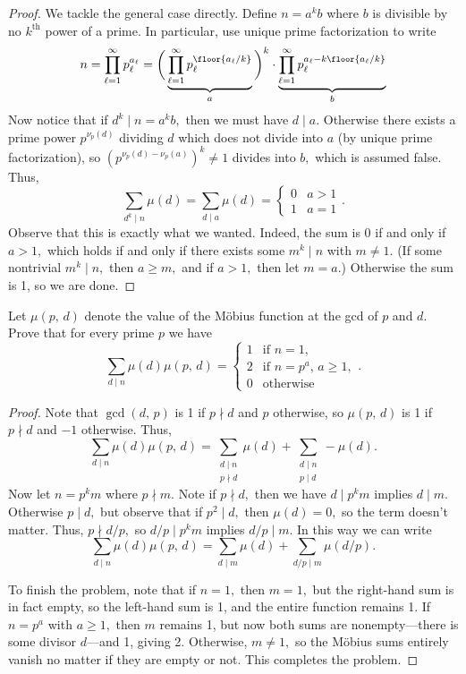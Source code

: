\begin{proof}
We tackle the general case directly. Define $n=a^kb$ where $b$ is divisible by no $k^\text{th}$ power of a prime. In particular, use unique prime factorization to write
\[n=\prod_{\ell=1}^\infty p_\ell^{a_\ell}=\bigg(\underbrace{\prod_{\ell=1}^\infty p_\ell^{\floor{a_\ell/k}}}_a\bigg)^k\cdot\underbrace{\prod_{\ell=1}^\infty p_\ell^{a_\ell-k\floor{a_\ell/k}}}_b\]
Now notice that if $d^k\mid n=a^kb,$ then we must have $d\mid a.$ Otherwise there exists a prime power $p^{\nu_p(d)}$ dividing $d$ which does not divide into $a$ (by unique prime factorization), so $\left(p^{\nu_p(d)-\nu_p(a)}\right)^k\ne1$ divides into $b,$ which is assumed false. Thus,
\[\sum_{d^k\mid n}\mu(d)=\sum_{d\mid a}\mu(d)=\begin{cases}0 & a>1 \\ 1 & a=1\end{cases}.\]
Observe that this is exactly what we wanted. Indeed, the sum is 0 if and only if $a>1,$ which holds if and only if there exists some $m^k\mid n$ with $m\ne1.$ (If some nontrivial $m^k\mid n,$ then $a\ge m,$ and if $a>1,$ then let $m=a.$) Otherwise the sum is 1, so we are done.
\end{proof}

\begin{exercise}
Let $\mu(p,\,d)$ denote the value of the M\"obius function at the gcd of $p$ and $d.$ Prove that for every prime $p$ we have
\[\sum_{d\mid n}\mu(d)\mu(p,\,d)=\begin{cases}1 &\text{if }n=1, \\
2 & \text{if }n=p^a,\,a\ge1, \\
0 & \text{otherwise}\end{cases}.\]
\end{exercise}

\begin{proof}
Note that $\gcd(d,\,p)$ is 1 if $p\nmid d$ and $p$ otherwise, so $\mu(p,\,d)$ is 1 if $p\nmid d$ and $-1$ otherwise. Thus,
\[\sum_{d\mid n}\mu(d)\mu(p,\,d)=\sum_{\substack{d\mid n\\p\nmid d}}\mu(d)+\sum_{\substack{d\mid n\\p\mid d}}-\mu(d).\]
Now let $n=p^km$ where $p\nmid m.$ Note if $p\nmid d,$ then we have $d\mid p^km$ implies $d\mid m.$ Otherwise $p\mid d,$ but observe that if $p^2\mid d,$ then $\mu(d)=0,$ so the term doesn't matter. Thus, $p\nmid d/p,$ so $d/p\mid p^km$ implies $d/p\mid m.$ In this way we can write
\[\sum_{d\mid n}\mu(d)\mu(p,\,d)=\sum_{d\mid m}\mu(d)+\sum_{d/p\mid m}\mu(d/p).\]

To finish the problem, note that if $n=1,$ then $m=1,$ but the right-hand sum is in fact empty, so the left-hand sum is 1, and the entire function remains 1. If $n=p^a$ with $a\ge1,$ then $m$ remains 1, but now both sums are nonempty---there is some divisor $d$---and 1, giving 2. Otherwise, $m\ne1,$ so the M\"obius sums entirely vanish no matter if they are empty or not. This completes the problem.
\end{proof}

